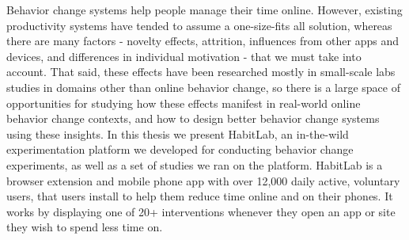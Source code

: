 \beforepreface
{}

Behavior change systems help people manage their time online. However, existing productivity systems have tended to assume a one-size-fits all solution, whereas there are many factors - novelty effects, attrition, influences from other apps and devices, and differences in individual motivation - that we must take into account. That said, these effects have been researched mostly in small-scale labs studies in domains other than online behavior change, so there is a large space of opportunities for studying how these effects manifest in real-world online behavior change contexts, and how to design better behavior change systems using these insights. In this thesis we present HabitLab, an in-the-wild experimentation platform we developed for conducting behavior change experiments, as well as a set of studies we ran on the platform. HabitLab is a browser extension and mobile phone app with over 12,000 daily active, voluntary users, that users install to help them reduce time online and on their phones. It works by displaying one of 20+ interventions whenever they open an app or site they wish to spend less time on.

